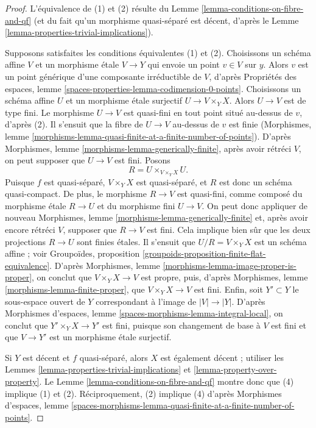 \begin{proof}
L'équivalence de (1) et (2) résulte du
Lemme \ref{lemma-conditions-on-fibre-and-qf}
(et du fait qu'un morphisme quasi-séparé est décent, d'après le
Lemme \ref{lemma-properties-trivial-implications}).

\medskip\noindent
Supposons satisfaites les conditions équivalentes (1) et (2). Choisissons un
schéma affine $V$ et un morphisme étale $V \to Y$ qui envoie un point
$v \in V$ sur $y$. Alors $v$ est un point générique d'une composante
irréductible de $V$, d'après Propriétés des espaces, lemme
\ref{spaces-properties-lemma-codimension-0-points}.
Choisissons un schéma affine $U$ et un morphisme étale surjectif
$U \to V \times_Y X$. Alors $U \to V$ est de type fini.
Le morphisme $U \to V$ est quasi-fini en tout point situé au-dessus de $v$,
d'après (2). Il s'ensuit que la fibre de $U \to V$ au-dessus de $v$ est finie
(Morphismes, lemme
\ref{morphisms-lemma-quasi-finite-at-a-finite-number-of-points}). D'après
Morphismes, lemme \ref{morphisms-lemma-generically-finite},
après avoir rétréci $V$, on peut supposer que $U \to V$ est fini.
Posons
$$
R = U \times_{V \times_Y X} U.
$$
Puisque $f$ est quasi-séparé, $V \times_Y X$ est quasi-séparé, et $R$ est
donc un schéma quasi-compact. De plus, le morphisme $R \to V$ est quasi-fini,
comme composé du morphisme étale $R \to U$ et du morphisme fini $U \to V$.
On peut donc appliquer de nouveau Morphismes, lemme
\ref{morphisms-lemma-generically-finite} et, après avoir encore rétréci $V$,
supposer que $R \to V$ est fini. Cela implique bien sûr que les deux
projections $R \to U$ sont finies étales. Il s'ensuit que
$U/R = V \times_Y X$ est un schéma affine ; voir Groupoïdes, proposition
\ref{groupoids-proposition-finite-flat-equivalence}.
D'après Morphismes, lemme \ref{morphisms-lemma-image-proper-is-proper},
on conclut que $V \times_Y X \to V$ est propre, puis, d'après
Morphismes, lemme \ref{morphisms-lemma-finite-proper},
que $V \times_Y X \to V$ est fini. Enfin, soit $Y' \subset Y$ le
sous-espace ouvert de $Y$
correspondant à l'image de $|V| \to |Y|$.
D'après Morphismes d'espaces, lemme
\ref{spaces-morphisms-lemma-integral-local}, on conclut que
$Y' \times_Y X \to Y'$ est fini, puisque son changement de base à $V$ est
fini et que $V \to Y'$ est un morphisme étale surjectif.

\medskip\noindent
Si $Y$ est décent et $f$ quasi-séparé, alors $X$ est également décent ;
utiliser les Lemmes \ref{lemma-properties-trivial-implications} et
\ref{lemma-property-over-property}.
Le Lemme \ref{lemma-conditions-on-fibre-and-qf} montre donc que (4) implique
(1) et (2). Réciproquement, (2) implique (4) d'après Morphismes d'espaces,
lemme \ref{spaces-morphisms-lemma-quasi-finite-at-a-finite-number-of-points}.
\end{proof}

